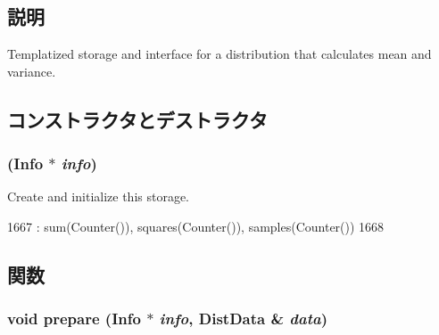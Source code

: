 \subsection{説明}
Templatized storage and interface for a distribution that calculates mean and variance. 

\subsection{コンストラクタとデストラクタ}
\hypertarget{classStats_1_1SampleStor_a864d8d22bc6b7acd98e34ae38ea2b5b7}{
\subsubsection[{SampleStor}]{ ({\bf Info} $\ast$ {\em info})}}
\label{classStats_1_1SampleStor_a864d8d22bc6b7acd98e34ae38ea2b5b7}
Create and initialize this storage. 


\begin{DoxyCode}
1667         : sum(Counter()), squares(Counter()), samples(Counter())
1668     { }
\end{DoxyCode}


\subsection{関数}
\hypertarget{classStats_1_1SampleStor_a2e5e3cd36b4a3d6ab774aed4e3fcd641}{
\subsubsection[{prepare}]{\setlength{\rightskip}{0pt plus 5cm}void prepare ({\bf Info} $\ast$ {\em info}, \/  {\bf DistData} \& {\em data})}}
\label{classStats_1_1SampleStor_a2e5e3cd36b4a3d6ab774aed4e3fcd641}



